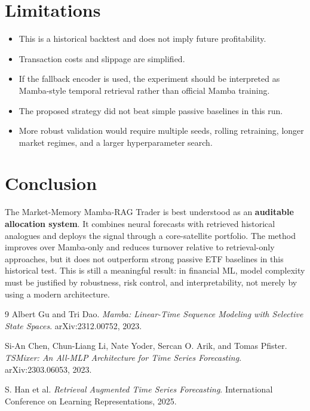 \documentclass[11pt]{article}
\begin{document}
\section{Limitations}
\begin{itemize}
    \item This is a historical backtest and does not imply future profitability.
    \item Transaction costs and slippage are simplified.
    \item If the fallback encoder is used, the experiment should be interpreted as Mamba-style temporal retrieval rather than official Mamba training.
    \item The proposed strategy did not beat simple passive baselines in this run.
    \item More robust validation would require multiple seeds, rolling retraining, longer market regimes, and a larger hyperparameter search.
\end{itemize}

\section{Conclusion}
The Market-Memory Mamba-RAG Trader is best understood as an \textbf{auditable allocation system}. It combines neural forecasts with retrieved historical analogues and deploys the signal through a core-satellite portfolio. The method improves over Mamba-only and reduces turnover relative to retrieval-only approaches, but it does not outperform strong passive ETF baselines in this historical test. This is still a meaningful result: in financial ML, model complexity must be justified by robustness, risk control, and interpretability, not merely by using a modern architecture.

\begin{thebibliography}{9}
Albert Gu and Tri Dao. \textit{Mamba: Linear-Time Sequence Modeling with Selective State Spaces}. arXiv:2312.00752, 2023.

Si-An Chen, Chun-Liang Li, Nate Yoder, Sercan O. Arik, and Tomas Pfister. \textit{TSMixer: An All-MLP Architecture for Time Series Forecasting}. arXiv:2303.06053, 2023.

S. Han et al. \textit{Retrieval Augmented Time Series Forecasting}. International Conference on Learning Representations, 2025.
\end{thebibliography}
\end{document}
